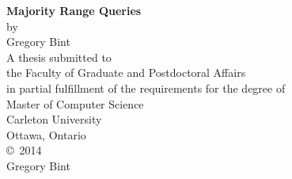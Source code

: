 \documentclass[12pt,letterpaper]{report}
\theoremstyle{definition}
\begin{document}
\begin{titlepage}
   \begin{center}
      \vspace*{\fill}
      \large
      {\bf \LARGE Majority Range Queries}\\
      \vspace{0.25in}
      by\\
      \vspace{0.25in}
      Gregory Bint\\
      \vspace{0.5in}
      A thesis submitted to\\
      the Faculty of Graduate and Postdoctoral Affairs\\
      in partial fulfillment of the requirements for the degree of\\
      \vspace{0.5in}
      Master of Computer Science\\
      \vspace{1.2in}
      Carleton University\\
      Ottawa, Ontario\\
      \vspace{0.5in}
      \copyright\ 2014\\
      Gregory Bint
      \vspace*{\fill}
   \end{center}
\end{titlepage}
\doublespacing
{}
\setcounter{page}{2}


\tableofcontents
\listoffigures
\listofalgorithms
\newpage
\pagestyle{fancy}
\setcounter{page}{1}







\cleardoublepage
{}


\end{document}
